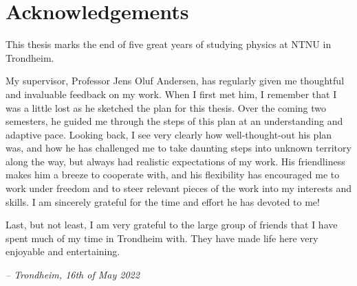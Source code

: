 \mbox{}\vfill
\begin{center}
\end{center}

\chapter*{Acknowledgements}

This thesis marks the end of five great years of studying physics at NTNU in Trondheim.

My supervisor, Professor Jens Oluf Andersen,
has regularly given me thoughtful and invaluable feedback on my work.
When I first met him,
I remember that I was a little lost as he sketched the plan for this thesis.
Over the coming two semesters, he guided me through the steps of this plan at an understanding and adaptive pace.
Looking back, I see very clearly how well-thought-out his plan was,
and how he has challenged me to take daunting steps into unknown territory along the way,
but always had realistic expectations of my work.
His friendliness makes him a breeze to cooperate with,
and his flexibility has encouraged me to work under freedom and to steer relevant pieces of the work into my interests and skills.
I am sincerely grateful for the time and effort he has devoted to me!

Last, but not least, I am very grateful to the large group of friends that I have spent much of my time in Trondheim with.
They have made life here very enjoyable and entertaining.

\null\hfill \textit{-- Trondheim, 16th of May 2022}

